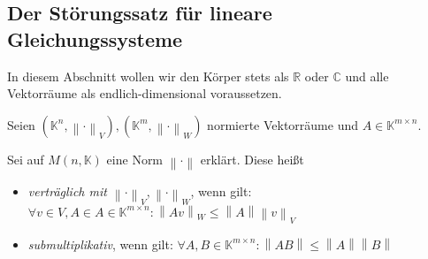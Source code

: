 \documentclass[10pt]{scrbook}
\begin{document}
\subsection{Der Störungssatz für lineare Gleichungssysteme}

\begin{Bem}
In diesem Abschnitt wollen wir den Körper stets als $\mathbb{R}$ oder $\mathbb{C}$ und alle Vektorräume als endlich-dimensional voraussetzen.
\end{Bem}

\begin{Def}
Seien $(\mathbb{K}^n, \left\|\cdot\right\|_V), (\mathbb{K}^m, \left\|\cdot\right\|_W)$ normierte Vektorräume und $A\in \mathbb{K}^{m\times n}$.

Sei auf $M(n, \mathbb{K})$ eine Norm $\left\|\cdot\right\|$ erklärt. Diese heißt
\begin{itemize}
	\item \emph{verträglich mit $\left\|\cdot\right\|_V, \left\|\cdot\right\|_W$}, wenn gilt: $\forall v\in V, A\in A\in \mathbb{K}^{m\times n}: \left\|A v\right\|_W\leq \left\|A\right\| \left\|v\right\|_V$
	\item \emph{submultiplikativ}, wenn gilt: $\forall A, B\in \mathbb{K}^{m\times n}: \left\|A B\right\|\leq \left\|A\right\| \left\|B\right\|$
\end{itemize}
\end{Def}
\end{document}
